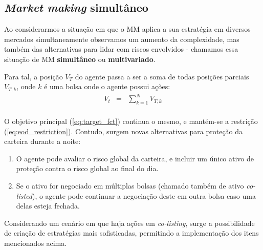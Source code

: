 \subsection{\textit{Market making} simultâneo}
Ao considerarmos a situação em que o MM aplica a sua estratégia em diversos mercados simultaneamente observamos um aumento da complexidade, mas também das alternativas para lidar com riscos envolvidos - chamamos essa situação de MM \textbf{simultâneo} ou \textbf{multivariado}.

Para tal, a posição $V_{T}$ do agente passa a ser a soma de todas posições parciais $V_{T, k}$, onde $k$ é uma bolsa onde o agente possui ações:
\begin{eqnarray*}
    V_t &=& \sum_{k=1}^N V_{T, k}\\
\end{eqnarray*}

O objetivo principal (\ref{eq:target_fct}) continua o mesmo, e mantém-se a restrição (\ref{eq:eod_restriction}). Contudo, surgem novas alternativas para proteção da carteira durante a noite:

\begin{enumerate}
    \item O agente pode avaliar o risco global da carteira, e incluir um único ativo de proteção contra o risco global ao final do dia.
    \item Se o ativo for negociado em múltiplas bolsas (chamado também de ativo \textit{co-listed}), o agente pode continuar a negociação deste em outra bolsa caso uma delas esteja fechada.
\end{enumerate}

Considerando um cenário em que haja ações em \textit{co-listing}, surge a possibilidade de criação de estratégias mais sofisticadas, permitindo a implementação dos itens mencionados acima.
 
